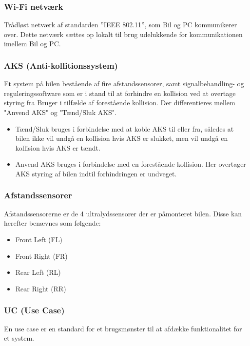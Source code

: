 \subsubsection{Wi-Fi netværk}
Trådløst netværk af standarden ''IEEE 802.11'', som Bil og PC kommunikerer over. Dette netværk sættes op lokalt til brug udelukkende for kommunikationen imellem Bil og PC. 

\subsubsection{AKS (Anti-kollitionssystem)}
Et system på bilen bestående af fire afstandssensorer, samt signalbehandling- og reguleringssoftware som er i stand til at forhindre en kollision ved at overtage styring fra Bruger i tilfælde af forestående kollision. Der differentieres mellem "Anvend AKS" og "Tænd/Sluk AKS".

\begin{itemize}
	\item Tænd/Sluk bruges i forbindelse med at koble AKS til eller fra, således at bilen ikke vil undgå en kollision hvis AKS er slukket, men vil undgå en kollision hvis AKS er tændt. 
	\item Anvend AKS bruges i forbindelse med en forestående kollision. Her overtager AKS styring af bilen indtil forhindringen er undveget. 
\end{itemize}

\subsubsection{Afstandssensorer}
Afstandssensorerne er de 4 ultralydssensorer der er påmonteret bilen. Disse kan herefter benævnes som følgende:
\begin{itemize}
	\item Front Left (FL)
	\item Front Right (FR)
	\item Rear Left (RL)
	\item Rear Right (RR)	
\end{itemize}

\subsubsection{UC (Use Case)}
En use case er en standard for et brugsmønster til at afdække funktionalitet for et system.

\clearpage